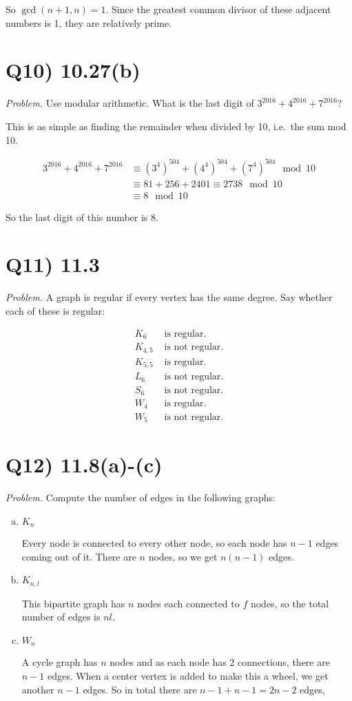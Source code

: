 \documentclass{article}
\begin{document}
So $\gcd(n+1, n) = 1$. Since the greatest common divisor of these adjacent numbers is 1, they are relatively prime.


\section*{Q10) 10.27(b)}

\textit{Problem.} Use modular arithmetic. What is the last digit of $3^{2016} + 4^{2016} + 7^{2016}$?

This is as simple as finding the remainder when divided by 10, i.e.\ the sum mod 10.

\begin{align*}
  3^{2016} + 4^{2016} + 7^{2016} &\equiv (3^4)^{504} + (4^4)^{504} + (7^4)^{504} \mod 10 \\
  &\equiv 81 + 256 + 2401 \equiv 2738 \mod 10 \\
  &\equiv 8 \mod 10
\end{align*}

So the last digit of this number is 8.


\section*{Q11) 11.3}

\textit{Problem.} A graph is regular if every vertex has the same degree. Say whether each of these is regular:

\begin{align*}
  K_6 &\text{ is regular.}\\ K_{4,5} &\text{ is not regular.} \\ 
  K_{5,5} &\text{ is regular.} \\ L_6 &\text{ is not regular.} \\ 
  S_6 &\text{ is not regular.} \\ W_4 &\text{ is regular.}\\
  W_5 &\text{ is not regular.}
\end{align*}




\section*{Q12) 11.8(a)-(c)}

\textit{Problem.} Compute the number of edges in the following graphs:

\begin{enumerate}[(a)]
  \item $K_n$ 
    
    Every node is connected to every other node, so each node has $n-1$ edges coming out of it. There are $n$ nodes, so we get $n(n-1)$ edges. 
  \item $K_{n,l}$ 
    
    This bipartite graph has $n$ nodes each connected to $f$ nodes, so the total number of edges is $nl$.
  \item $W_n$ 
    
   A cycle graph has $n$ nodes and as each node has 2 connections, there are $n-1$ edges. When a center vertex is added to make this a wheel, we get another $n-1$ edges. So in total there are $n-1 + n-1 = 2n - 2$ edges,
\end{enumerate}
\end{document}
